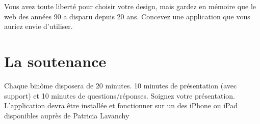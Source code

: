 \documentclass[a4paper,11pt]{scrartcl}
\begin{document}
Vous avez toute liberté pour choisir votre design, mais gardez en mémoire que le web des années 90 a disparu depuis 20 ans. Concevez une application que vous auriez envie d'utiliser.

\section*{La soutenance}

Chaque binôme disposera de 20 minutes. 10 minutes de présentation (avec support) et 10 minutes de questions/réponses. Soignez votre présentation. L'application devra être installée et fonctionner sur un des iPhone ou iPad disponibles auprès de Patricia Lavanchy
\end{document}
